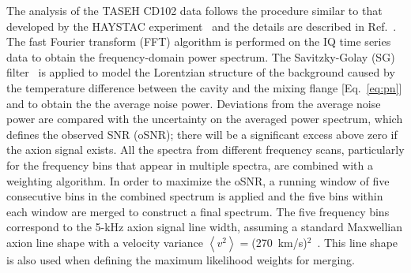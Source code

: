 \documentclass[%
 reprint,prl, %
superscriptaddress,
nobibnotes,
 amsmath,amssymb,
 aps,
]{revtex4-2}
\newcommand{\ma}{\ensuremath{m_a}}
\begin{document}
%




   The analysis of the TASEH CD102 data follows the procedure similar to that 
developed by the HAYSTAC experiment~\cite{HAYSTACII} and the details are 
described in Ref.~\cite{TASEHAnalysis}. The fast Fourier transform (FFT) 
algorithm is performed on the IQ time series data to obtain the 
frequency-domain power spectrum. 
The Savitzky-Golay (SG) 
filter~\cite{SGFilter} is applied to model the Lorentzian structure of 
the background caused by the temperature difference between the cavity and 
the mixing flange [Eq.~\eqref{eq:pn}] and to obtain the 
the average noise power. %
Deviations from the average noise power are compared with the 
uncertainty on the averaged power spectrum, which defines the 
observed SNR (oSNR); there will be a significant excess above zero if the 
axion signal exists. All the spectra from different 
frequency scans, particularly for the frequency bins that appear in 
multiple spectra, are combined with a weighting algorithm. 
In order to maximize the oSNR, a running window of 
five consecutive bins in the combined spectrum is applied and the five bins 
within each window are merged to construct a final spectrum. 
The five frequency bins correspond to the 5-kHz axion signal line width,  
assuming a standard Maxwellian axion line shape with a velocity 
variance $\left<v^2\right>=$(270~km/s)$^2$~\cite{HAYSTACII}. 
This line shape is also used when defining the maximum likelihood 
weights for merging. 
\end{document}
